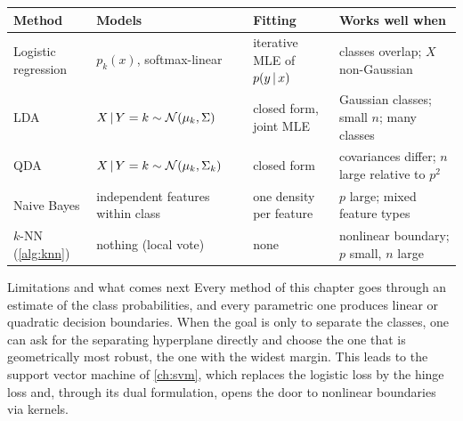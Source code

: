 \begin{center}
\small
\begin{tabularx}{\textwidth}{@{}l>{\raggedright\arraybackslash}X>{\raggedright\arraybackslash}X>{\raggedright\arraybackslash}X@{}}
\toprule
Method & Models & Fitting & Works well when \\
\midrule
Logistic regression & $p_k(x)$, softmax-linear & iterative MLE of $p(y\,|\, x)$ & classes overlap; $X$ non-Gaussian \\
LDA & $X\,|\, Y=k\sim\mathcal{N}(\mu_k,\Sigma)$ & closed form, joint MLE & Gaussian classes; small $n$; many classes \\
QDA & $X\,|\, Y=k\sim\mathcal{N}(\mu_k,\Sigma_k)$ & closed form & covariances differ; $n$ large relative to $p^2$ \\
Naive Bayes & independent features within class & one density per feature & $p$ large; mixed feature types \\
$k$-NN (\cref{alg:knn}) & nothing (local vote) & none & nonlinear boundary; $p$ small, $n$ large \\
\bottomrule
\end{tabularx}
\end{center}

\begin{notebox}{Limitations and what comes next}
Every method of this chapter goes through an estimate of the class probabilities, and every parametric one produces linear or quadratic decision boundaries. When the goal is only to separate the classes, one can ask for the separating hyperplane directly and choose the one that is geometrically most robust, the one with the widest margin. This leads to the support vector machine of \cref{ch:svm}, which replaces the logistic loss by the hinge loss and, through its dual formulation, opens the door to nonlinear boundaries via kernels.
\end{notebox}
